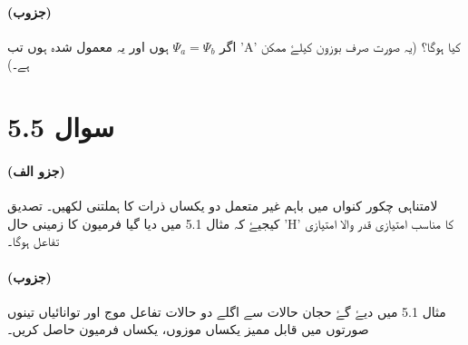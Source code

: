 \documentclass{book}
\begin{document}
\paragraph*{(جزوب)}
اگر  $ \Psi_{a} = \Psi_{b} $ ہوں اور یہ معمول شدہ ہوں تب 'A' کیا ہوگا؟ (یہ صورت صرف بوزون کیلۓ ممکن ہے۔)
\section*{سوال 5.5} 
\paragraph*{(جزو الف)}
لامتناہی چکور کنواں میں باہم غیر متعمل دو یکساں ذرات کا ہملتنی لکھیں۔ تصدیق کیجیۓ کہ مثال 5.1 میں دیا گیا فرمیون کا زمینی حال 'H' کا مناسب امتیازی قدر والا امتیازی تفاعل ہوگا۔ 
\paragraph*{(جزوب)}
مثال 5.1 میں دیۓ گۓ حجان حالات سے اگلے دو حالات تفاعل موج اور توانائیاں تینوں صورتوں میں قابل ممیز یکساں موزوں، یکساں فرمیون حاصل کریں۔
\end{document}
